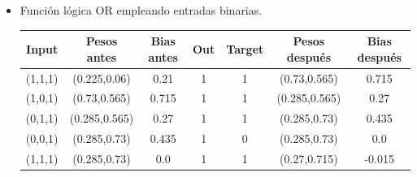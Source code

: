 \begin{problem}[16]
\begin{itemize}
\item Función lógica OR empleando entradas binarias.
\begin{center}
\begin{tabular}{|c|c|c|c|c|c|c|}
\hline
\textbf{Input} & \textbf{Pesos antes} &  \textbf{Bias antes} & \textbf{Out} & \textbf{Target} & \textbf{Pesos después} & \textbf{Bias después} \\
\hline
(1,1,1) & (0.225,0.06) & 0.21 & 1 & 1 & (0.73,0.565) & 0.715\\
(1,0,1) & (0.73,0.565) & 0.715 & 1 & 1 & (0.285,0.565) & 0.27\\
(0,1,1) & (0.285,0.565) & 0.27 & 1 & 1 & (0.285,0.73) & 0.435\\
(0,0,1) & (0.285,0.73) & 0.435 & 1 & 0 & (0.285,0.73) & 0.0\\
(1,1,1) & (0.285,0.73) & 0.0 & 1 & 1 & (0.27,0.715) & -0.015\\
\hline
\end{tabular}
\end{center}

\end{itemize}
\end{problem}

